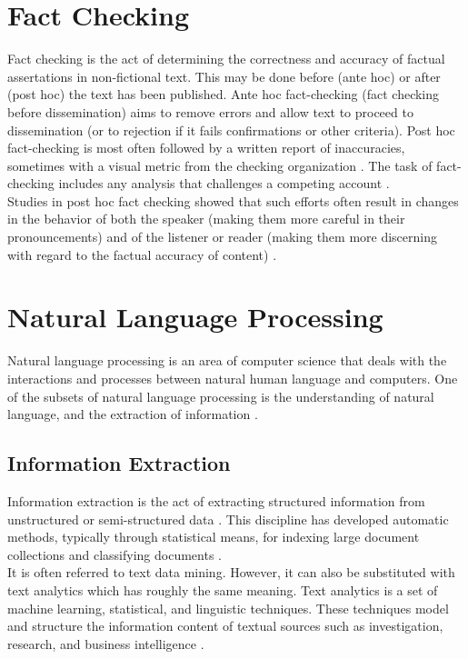\documentclass[10pt,11pt,12pt,oneside]{book}
\begin{document}
	\section{Fact Checking}
	
	Fact checking is the act of determining the correctness and accuracy of factual assertations in non-fictional text. This may be done before (ante hoc) or after (post hoc) the text has been published. Ante hoc fact-checking (fact checking before dissemination) aims to remove errors and allow text to proceed to dissemination (or to rejection if it fails confirmations or other criteria). Post hoc fact-checking is most often followed by a written report of inaccuracies, sometimes with a visual metric from the checking organization \cite{fellmeth_horwitz_2009}. The task of fact-checking includes any analysis that challenges a competing account \cite{graves_2016}.\\[8pt]
	
	Studies in post hoc fact checking showed that such efforts often result in changes in the behavior of both the speaker (making them more careful in their pronouncements) and of the listener or reader (making them more discerning with regard to the factual accuracy of content) \cite{amazeen_2015}.
	
	\section{Natural Language Processing}
	
	Natural language processing is an area of computer science that deals with the interactions and processes between natural human language and computers. One of the subsets of natural language processing is the understanding of natural language, and the extraction of information \cite{bird2009natural}.\\
	
	\subsection{Information Extraction}
	Information extraction is the act of extracting structured information from unstructured or semi-structured data \cite{mooney2005mining}. This discipline has developed automatic methods, typically through statistical means, for indexing large document collections and classifying documents \cite{freitag2000machine}.\\[8pt]
	
	It is often referred to text data mining. However, it can also be substituted with text analytics which has roughly the same meaning. Text analytics is a set of machine learning, statistical, and linguistic techniques. These techniques model and structure the information content of textual sources such as investigation, research, and business intelligence \cite{sethgrimes}.\\
	
\end{document}
